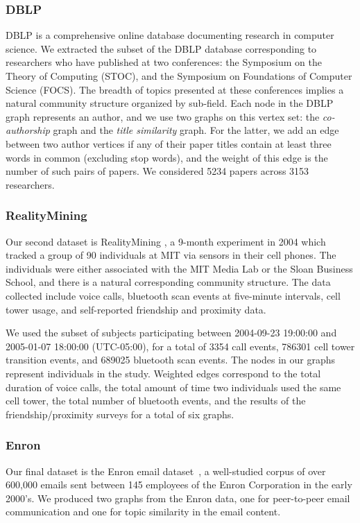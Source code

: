 \documentclass{IEEEtran}
\begin{document}
\subsubsection{DBLP}
DBLP \cite{Ley02} is a comprehensive online database documenting research in
computer science. We extracted the subset of the DBLP database corresponding to
researchers who have published at two conferences: the Symposium on the Theory
of Computing (STOC), and the Symposium on Foundations of Computer Science
(FOCS). The breadth of topics presented at these conferences implies a natural
community structure organized by sub-field. Each node in the DBLP graph
represents an author, and we use two graphs on this vertex set: the {\em
co-authorship} graph and the {\em title similarity} graph. For the latter, we
add an edge between two author vertices if any of their paper titles contain at
least three words in common (excluding stop words), and the weight of this edge
is the number of such pairs of papers. We considered 5234 papers across 3153
researchers.

\subsubsection{RealityMining}
Our second dataset is RealityMining \cite{RealityMining}, a 9-month experiment
in 2004 which tracked a group of 90 individuals at MIT via sensors in their
cell phones. The individuals were either associated with the MIT Media Lab or
the Sloan Business School, and there is a natural corresponding community
structure. The data collected include voice calls, bluetooth scan events at
five-minute intervals, cell tower usage, and self-reported friendship and
proximity data. 

We used the subset of subjects participating between 2004-09-23 19:00:00 and
2005-01-07 18:00:00 (UTC-05:00), for a total of 3354 call events, 786301 cell
tower transition events, and 689025 bluetooth scan events. The nodes in our
graphs represent individuals in the study. Weighted edges correspond to the
total duration of voice calls, the total amount of time two individuals used
the same cell tower, the total number of bluetooth events, and the results of
the friendship/proximity surveys for a total of six graphs. 

\subsubsection{Enron}
Our final dataset is the Enron email dataset~\cite{EnronConf, Enron}, a
well-studied corpus of over 600,000 emails sent between 145 employees of the
Enron Corporation in the early 2000's. We produced two graphs from the Enron
data, one for peer-to-peer email communication and one for topic similarity in
the email content. 
\end{document}
